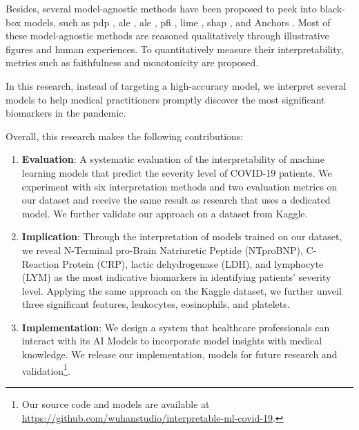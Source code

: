Besides, several model-agnostic methods have been proposed to peek into black-box models, such as \acrfull{pdp} \citep{Friedman2001GreedyFA}, \acrfull{ale} \citep{goldstein2013peeking}, \acrfull{ale} \citep{apley2016visualizing}, \acrfull{pfi} \citep{fisher2018models}, \acrfull{lime} \citep{ribeiro2016i}, \acrfull{shap} \citep{lundberg2017unified}, and Anchors \citep{Ribeiro2018AnchorsHM}. Most of these model-agnostic methods are reasoned qualitatively through illustrative figures and human experiences. To quantitatively measure their interpretability, metrics such as faithfulness \citep{alvarezmelis2018robust} and monotonicity \citep{luss2019generating} are proposed.

In this research, instead of targeting a high-accuracy model, we interpret several models to help medical practitioners promptly discover the most significant biomarkers in the pandemic.

Overall, this research makes the following contributions:

\begin{enumerate}
    \item \textbf{Evaluation}: A systematic evaluation of the interpretability of machine learning models that predict the severity level of COVID-19 patients. We experiment with six interpretation methods and two evaluation metrics on our dataset and receive the same result as research that uses a dedicated model. We further validate our approach on a dataset from Kaggle.
    \item \textbf{Implication}: Through the interpretation of models trained on our dataset, we reveal N-Terminal pro-Brain Natriuretic Peptide (NTproBNP), C-Reaction Protein (CRP), lactic dehydrogenase (LDH), and lymphocyte (LYM) as the most indicative biomarkers in identifying patients' severity level. Applying the same approach on the Kaggle dataset, we further unveil three significant features, leukocytes, eosinophils, and platelets.
    \item \textbf{Implementation}: We design a system that healthcare professionals can interact with its AI Models to incorporate model insights with medical knowledge. We release our implementation, models for future research and validation\footnote{Our source code and models are available at \url{https://github.com/wuhanstudio/interpretable-ml-covid-19}.}.
\end{enumerate}



